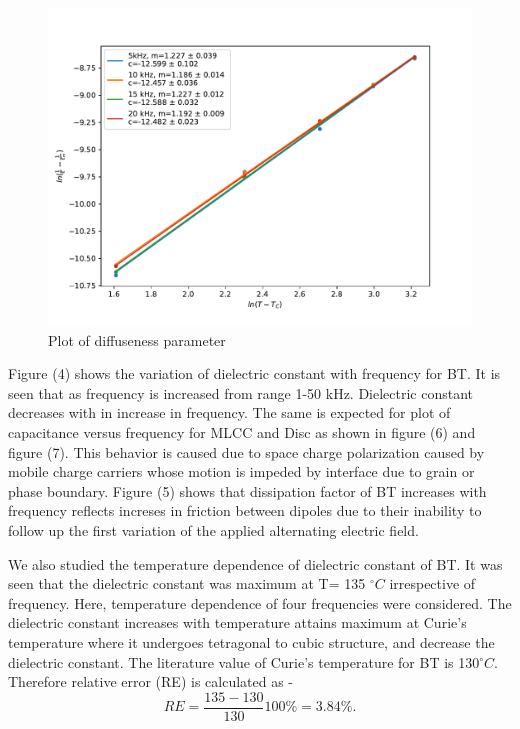 \documentclass[a4paper, amsfonts, amssymb, amsmath, reprint, showkeys, nofootinbib, twoside]{revtex4-1}
\begin{document}
\begin{figure}[H]
	\centering
	\includegraphics[scale=0.5]{ln}
	\caption{Plot of diffuseness parameter}
	\label{1}
\end{figure}

Figure (4) shows the variation of dielectric constant with frequency for BT. It is seen that as frequency is increased from range 1-50 kHz. Dielectric constant decreases with in increase in frequency. The same is expected for plot of capacitance versus frequency for MLCC and Disc as shown in figure (6) and figure (7). This behavior is caused due to space charge polarization caused by mobile charge carriers whose motion is impeded by interface due to grain or phase boundary. Figure (5) shows that dissipation factor of BT increases with frequency reflects increses in friction between dipoles due to their inability to follow up the first variation of the applied alternating electric field.

We also studied the temperature dependence of dielectric constant of BT. It was seen that the dielectric constant was maximum at T= 135 $^\circ C$ irrespective of frequency. Here, temperature dependence of four frequencies were considered. The dielectric constant increases with temperature attains maximum at Curie's temperature where it undergoes tetragonal to cubic structure, and decrease the dielectric constant. The literature value of Curie's temperature for BT is 130$^\circ C$.
Therefore relative error (RE) is calculated as -
\begin{equation}
	RE=\frac{135-130}{130}100\%=3.84\%.
\end{equation}
\end{document}
